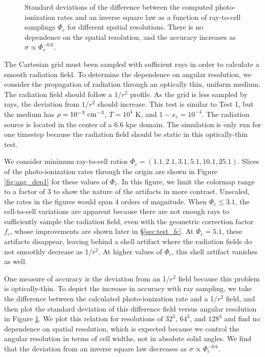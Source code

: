 \documentclass[apj,onecolumn]{emulateapj}
\begin{document}
\begin{figure}[t]
  \caption{\label{fig:ang_dep2} Standard deviations of the difference
    between the computed photo-ionization rates and an inverse square
    law as a function of ray-to-cell samplings $\Phi_c$ for different
    spatial resolutions.  There is no dependence on the spatial
    resolution, and the accuracy increases as $\sigma \propto
    \Phi_c^{-0.6}$.}
\end{figure}

The Cartesian grid must been sampled with sufficient rays in order to
calculate a smooth radiation field.  To determine the dependence on
angular resolution, we consider the propagation of radiation through
an optically thin, uniform medium.  The radiation field should follow
a $1/r^2$ profile.  As the grid is less sampled by rays, the deviation
from $1/r^2$ should increase.  This test is similar to Test 1, but the
medium has $\rho = 10^{-3}~\cubecm$, $T = 10^4$ K, and $1 - x_e =
10^{-4}$.  The radiation source is located in the center of a 6.6 kpc
domain.  The simulation is only run for one timestep because the
radiation field should be static in this optically-thin test.  

We consider minimum ray-to-cell ratios $\Phi_c = (1.1, 2.1, 3.1, 5.1,
10.1, 25.1)$.  Slices of the photo-ionization rates through the origin
are shown in Figure \ref{fig:ang_dep1} for these values of $\Phi_c$.
In this figure, we limit the colormap range to a factor of 3 to show
the nature of the artifacts in more contrast.  Unscaled, the rates in
the figures would span 4 orders of magnitude.  When $\Phi_c \le 3.1$,
the cell-to-cell variations are apparent because there are not enough
rays to sufficiently sample the radiation field, even with the
geometric correction factor $f_c$, whose improvements are shown later
in \S\ref{sec:test_fc}.  At $\Phi_c = 5.1$, these artifacts disappear,
leaving behind a shell artifact where the radiation fields do not
smoothly decrease as 1/$r^2$.  At higher values of $\Phi_c$, this
shell artifact vanishes as well.  

One measure of accuracy is the deviation from an 1/$r^2$ field because
this problem is optically-thin.  To depict the increase in accuracy
with ray sampling, we take the difference between the calculated
photo-ionization rate and a 1/$r^2$ field, and then plot the standard
deviation of this difference field versus angular resolution in Figure
\ref{fig:ang_dep2}.  We plot this relation for resolutions of $32^3$,
$64^3$, and $128^3$ and find no dependence on spatial resolution,
which is expected because we control the angular resolution in terms
of cell widths, not in absolute solid angles.  We find that the
deviation from an inverse square law decreases as $\sigma \propto
\Phi_c^{-0.6}$.
\end{document}
